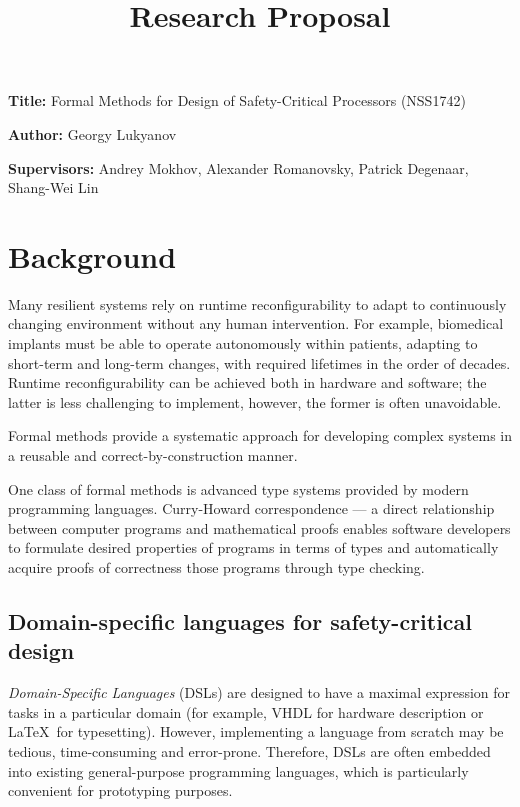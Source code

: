 \documentclass[12pt, a4paper]{article}
\title{Research Proposal}
\author{}
\date{}
\newcommand{\namelistlabel}[1]{\mbox{#1}\hfil}
\newenvironment{namelist}[1]{%
\begin{list}{}
    {
        \let\makelabel\namelistlabel
        \settowidth{\labelwidth}{#1}
        \setlength{\leftmargin}{1.1\labelwidth}
    }
  }{%
\end{list}}
\begin{document}
\maketitle

\begin{namelist}{xxxxxxxxxxxx}
\item[{\bf Title:}]
  Formal Methods for Design of Safety-Critical Processors (NSS1742)
\item[{\bf Author:}]
  Georgy Lukyanov
\item[{\bf Supervisors:}]
  Andrey Mokhov, Alexander Romanovsky, Patrick Degenaar, Shang-Wei Lin
\end{namelist}

\section{Background} 

Many resilient systems rely on runtime reconfigurability
to adapt to continuously changing environment without any
human intervention. For example, biomedical implants must
be able to operate autonomously within patients, adapting
to short-term and long-term changes, with required lifetimes
in the order of decades. Runtime reconfigurability can be
achieved both in hardware and software; the latter is less challenging 
to implement, however, the former is often unavoidable.

Formal methods provide a systematic approach for developing complex systems 
in a reusable and correct-by-construction manner.

One class of formal methods is advanced type systems provided by modern
programming languages. Curry-Howard correspondence --- a direct relationship
between computer programs and mathematical proofs enables software developers
to formulate desired properties of programs in terms of types and automatically 
acquire proofs of correctness those programs through type checking.

\subsection{Domain-specific languages for safety-critical design}

\emph{Domain-Specific Languages} (DSLs) are designed to have a maximal 
expression for tasks in a particular domain (for example, VHDL for hardware
description or \LaTeX~for typesetting). However, implementing a language
from scratch may be tedious, time-consuming and error-prone. Therefore,
DSLs are often embedded into existing general-purpose programming languages,
which is particularly convenient for prototyping purposes.
\end{document}

